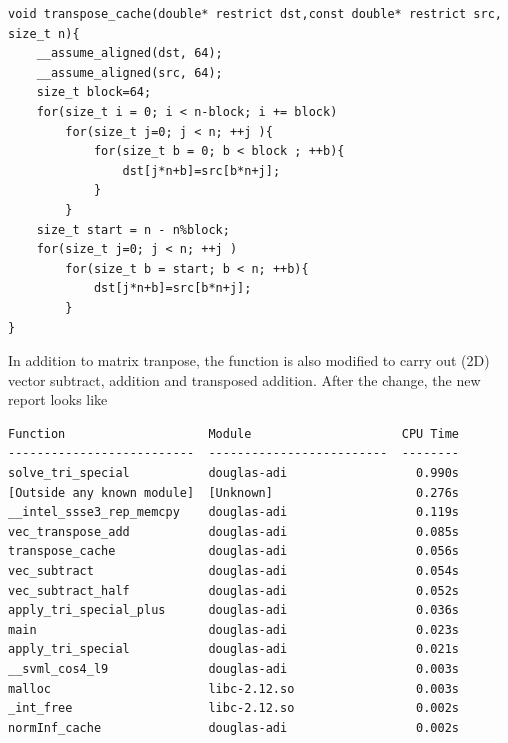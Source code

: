 \documentclass[a4paper,11pt]{article}
\begin{document}
\begin{minipage}{\textwidth}
\begin{framed}
\begin{verbatim}
void transpose_cache(double* restrict dst,const double* restrict src, size_t n){
    __assume_aligned(dst, 64);
    __assume_aligned(src, 64);
    size_t block=64;
    for(size_t i = 0; i < n-block; i += block)
        for(size_t j=0; j < n; ++j ){
            for(size_t b = 0; b < block ; ++b){
                dst[j*n+b]=src[b*n+j];
            }
        }
    size_t start = n - n%block;
    for(size_t j=0; j < n; ++j )
        for(size_t b = start; b < n; ++b){
            dst[j*n+b]=src[b*n+j];
        }
}	
\end{verbatim}
\end{framed}
\end{minipage}
\par
In addition to matrix tranpose, the function is also modified to carry out (2D) vector subtract, addition and transposed addition. After the change, the new report looks like
\\
\noindent \begin{minipage}{\textwidth}
	\begin{framed}
		\begin{center}
			\begin{verbatim}
Function                    Module                     CPU Time 
--------------------------  -------------------------  -------- 
solve_tri_special           douglas-adi                  0.990s                                              
[Outside any known module]  [Unknown]                    0.276s                                              
__intel_ssse3_rep_memcpy    douglas-adi                  0.119s                                              
vec_transpose_add           douglas-adi                  0.085s                                               
transpose_cache             douglas-adi                  0.056s                                              
vec_subtract                douglas-adi                  0.054s                                              
vec_subtract_half           douglas-adi                  0.052s                                              
apply_tri_special_plus      douglas-adi                  0.036s                                              
main                        douglas-adi                  0.023s                                              
apply_tri_special           douglas-adi                  0.021s                                              
__svml_cos4_l9              douglas-adi                  0.003s                                              
malloc                      libc-2.12.so                 0.003s                                              
_int_free                   libc-2.12.so                 0.002s                                              
normInf_cache               douglas-adi                  0.002s                                              
			\end{verbatim}	
		\end{center}
	\end{framed}
\end{minipage}
\end{document}
